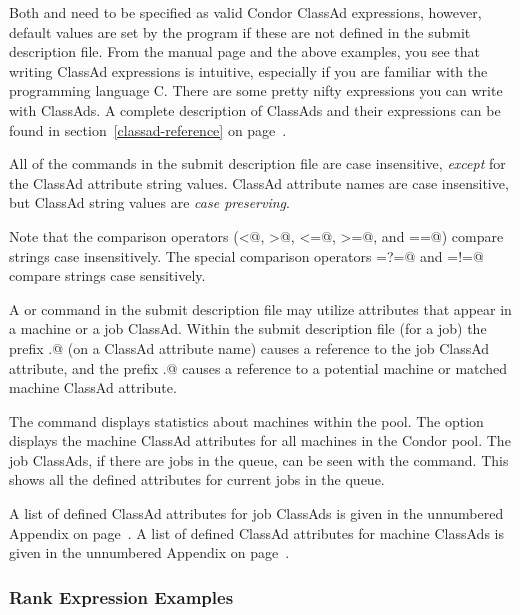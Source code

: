 Both  and  need to be specified 
as valid Condor ClassAd expressions, however, default values are set by the
 program if these are not defined in the submit description file.
From the  manual page and the above examples, you see
that writing ClassAd expressions is intuitive, especially if you
are familiar with the programming language C.  There are some
pretty nifty expressions you can write with ClassAds.
A complete description of ClassAds and their expressions
can be found in section~\ref{classad-reference} on 
page~\pageref{classad-reference}.

All of the commands in the submit description file are case insensitive, 
\emph{except} for the ClassAd attribute string values.
ClassAd attribute names are
case insensitive, but ClassAd string
values are \emph{case preserving}.

Note that the comparison operators
(\verb@<@, \verb@>@, \verb@<=@, \verb@>=@, and \verb@==@)
compare strings
case insensitively.  The special comparison operators 
\verb@=?=@ and \verb@=!=@
compare strings case sensitively.

A   or  command in
the submit description file may utilize attributes
that appear in a machine or a job ClassAd.
Within the submit description file (for a job) the
prefix \verb@MY.@ (on a ClassAd attribute name)
causes a reference to the job ClassAd attribute,
and the prefix \verb@TARGET.@ causes a reference to 
a potential machine or matched machine ClassAd attribute.

The  command displays
statistics about machines within the pool.
The  option displays the
machine ClassAd attributes for all machines in the Condor pool.
The job ClassAds, if there are jobs in the queue, can be seen
with the  command.
This shows all the defined attributes for current jobs in the queue.

A list of defined ClassAd attributes for job ClassAds
is given in the unnumbered Appendix on 
page~\pageref{sec:Job-ClassAd-Attributes}.
A list of defined ClassAd attributes for machine ClassAds
is given in the unnumbered Appendix on 
page~\pageref{sec:Machine-ClassAd-Attributes}.


\subsubsection{\label{rank-examples}Rank Expression Examples}

